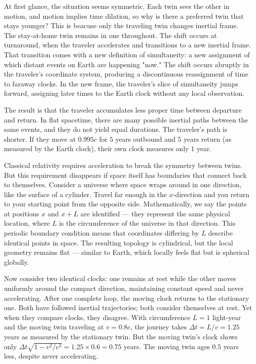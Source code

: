 At first glance, the situation seems symmetric. Each twin sees the other in motion, and motion implies time dilation, so why is there a preferred twin that stays younger? This is beacuse only the traveling twin changes inertial frame. The stay-at-home twin remains in one throughout. The shift occurs at turnaround, when the traveler accelerates and transitions to a new inertial frame. That transition comes with a new definition of simultaneity: a new assignment of which distant events on Earth are happening "now." The shift occurs abruptly in the traveler's coordinate system, producing a discontinuous reassignment of time to faraway clocks. In the new frame, the traveler's slice of simultaneity jumps forward, assigning later times to the Earth clock without any local observation. 

The result is that the traveler accumulates less proper time between departure and return. In flat spacetime, there are many possible inertial paths between the same events, and they do not yield equal durations. The traveler's path is shorter. If they move at $0.995c$ for $5$ years outbound and $5$ years return (as measured by the Earth clock), their own clock measures only $1$ year. 

Classical relativity requires acceleration to break the symmetry between twins. But this requirement disappears if space itself has boundaries that connect back to themselves. Consider a universe where space wraps around in one direction, like the surface of a cylinder. Travel far enough in the $x$-direction and you return to your starting point from the opposite side. Mathematically, we say the points at positions $x$ and $x + L$ are identified — they represent the same physical location, where $L$ is the circumference of the universe in that direction. This periodic boundary condition means that coordinates differing by $L$ describe identical points in space. The resulting topology is cylindrical, but the local geometry remains flat — similar to Earth, which locally feels flat but is spherical globally.

Now consider two identical clocks: one remains at rest while the other moves uniformly around the compact direction, maintaining constant speed and never accelerating. After one complete loop, the moving clock returns to the stationary one. Both have followed inertial trajectories; both consider themselves at rest. Yet when they compare clocks, they disagree. With circumference $L = 1$ light-year and the moving twin traveling at $v = 0.8c$, the journey takes $\Delta t = L/v = 1.25$ years as measured by the stationary twin. But the moving twin's clock shows only $\Delta t \sqrt{1 - v^2/c^2} = 1.25 \times 0.6 = 0.75$ years. The moving twin ages $0.5$ years less, despite never accelerating.

